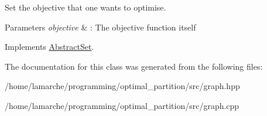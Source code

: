 Set the objective that one wants to optimise. 


\begin{DoxyParams}{Parameters}
{\em objective} & \-: The objective function itself \\
\hline
\end{DoxyParams}


Implements \hyperlink{classAbstractSet_a7aef71679a18ab7965d1098da15b26c2}{Abstract\-Set}.



The documentation for this class was generated from the following files\-:\begin{DoxyCompactItemize}
\item 
/home/lamarche/programming/optimal\-\_\-partition/src/graph.\-hpp\item 
/home/lamarche/programming/optimal\-\_\-partition/src/graph.\-cpp\end{DoxyCompactItemize}
